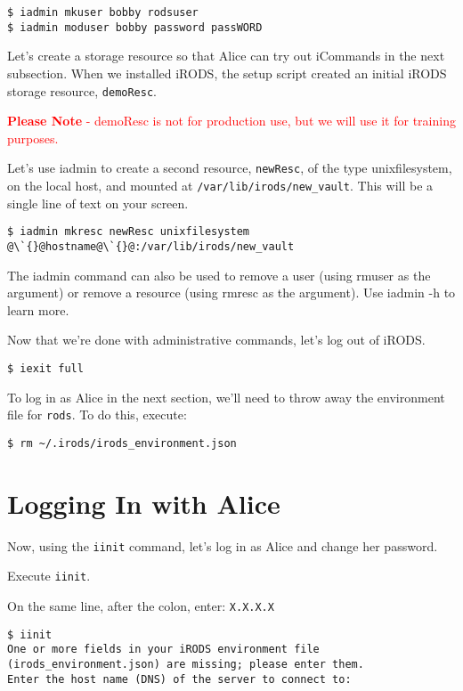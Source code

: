 \documentclass[10pt,oneside]{memoir}
\begin{document}
\begin{lstlisting}
$ iadmin mkuser bobby rodsuser
$ iadmin moduser bobby password passWORD
\end{lstlisting}

Let's create a storage resource so that Alice can try out iCommands in the next subsection. When we installed iRODS, the setup script created an initial iRODS storage resource, \texttt{demoResc}.

\textcolor{red}{\textbf{Please Note} - demoResc is not for production use, but we will use it for training purposes.}

Let's use iadmin to create a second resource, \texttt{newResc}, of the type unixfilesystem, on the local host, and mounted at \texttt{/var/lib/irods/new\_vault}. This will be a single line of text on your screen.

\begin{lstlisting}[basicstyle=\scriptsize\ttfamily]
$ iadmin mkresc newResc unixfilesystem @\`{}@hostname@\`{}@:/var/lib/irods/new_vault
\end{lstlisting}

The iadmin command can also be used to remove a user (using rmuser as the argument) or remove a resource (using rmresc as the argument). Use iadmin -h to learn more.

Now that we're done with administrative commands, let's log out of iRODS.

\begin{lstlisting}
$ iexit full
\end{lstlisting}

To log in as Alice in the next section, we'll need to throw away the environment file for \texttt{rods}. To do this, execute:

\begin{lstlisting}
$ rm ~/.irods/irods_environment.json
\end{lstlisting}

\section{Logging In with Alice}
\label{sec:logging_in_with_alice}

Now, using the \texttt{iinit} command, let's log in as Alice and change her password.

Execute \texttt{iinit}.

On the same line, after the colon, enter: \texttt{X.X.X.X}

\begin{lstlisting}[basicstyle=\scriptsize\ttfamily]
$ iinit
One or more fields in your iRODS environment file (irods_environment.json) are missing; please enter them.
Enter the host name (DNS) of the server to connect to:
\end{lstlisting}
\end{document}
